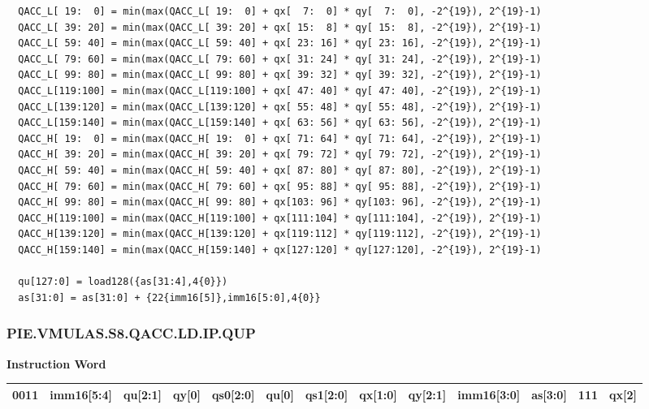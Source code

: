 \begin{lstlisting}
  QACC_L[ 19:  0] = min(max(QACC_L[ 19:  0] + qx[  7:  0] * qy[  7:  0], -2^{19}), 2^{19}-1)
  QACC_L[ 39: 20] = min(max(QACC_L[ 39: 20] + qx[ 15:  8] * qy[ 15:  8], -2^{19}), 2^{19}-1)
  QACC_L[ 59: 40] = min(max(QACC_L[ 59: 40] + qx[ 23: 16] * qy[ 23: 16], -2^{19}), 2^{19}-1)
  QACC_L[ 79: 60] = min(max(QACC_L[ 79: 60] + qx[ 31: 24] * qy[ 31: 24], -2^{19}), 2^{19}-1)
  QACC_L[ 99: 80] = min(max(QACC_L[ 99: 80] + qx[ 39: 32] * qy[ 39: 32], -2^{19}), 2^{19}-1)
  QACC_L[119:100] = min(max(QACC_L[119:100] + qx[ 47: 40] * qy[ 47: 40], -2^{19}), 2^{19}-1)
  QACC_L[139:120] = min(max(QACC_L[139:120] + qx[ 55: 48] * qy[ 55: 48], -2^{19}), 2^{19}-1)
  QACC_L[159:140] = min(max(QACC_L[159:140] + qx[ 63: 56] * qy[ 63: 56], -2^{19}), 2^{19}-1)
  QACC_H[ 19:  0] = min(max(QACC_H[ 19:  0] + qx[ 71: 64] * qy[ 71: 64], -2^{19}), 2^{19}-1)
  QACC_H[ 39: 20] = min(max(QACC_H[ 39: 20] + qx[ 79: 72] * qy[ 79: 72], -2^{19}), 2^{19}-1)
  QACC_H[ 59: 40] = min(max(QACC_H[ 59: 40] + qx[ 87: 80] * qy[ 87: 80], -2^{19}), 2^{19}-1)
  QACC_H[ 79: 60] = min(max(QACC_H[ 79: 60] + qx[ 95: 88] * qy[ 95: 88], -2^{19}), 2^{19}-1)
  QACC_H[ 99: 80] = min(max(QACC_H[ 99: 80] + qx[103: 96] * qy[103: 96], -2^{19}), 2^{19}-1)
  QACC_H[119:100] = min(max(QACC_H[119:100] + qx[111:104] * qy[111:104], -2^{19}), 2^{19}-1)
  QACC_H[139:120] = min(max(QACC_H[139:120] + qx[119:112] * qy[119:112], -2^{19}), 2^{19}-1)
  QACC_H[159:140] = min(max(QACC_H[159:140] + qx[127:120] * qy[127:120], -2^{19}), 2^{19}-1)

  qu[127:0] = load128({as[31:4],4{0}})
  as[31:0] = as[31:0] + {22{imm16[5]},imm16[5:0],4{0}}
\end{lstlisting}

\newpage
\subsubsection{PIE.VMULAS.S8.QACC.LD.IP.QUP}\label{instruction:PIEVMULASS8QACCLDIPQUP}
\setlength\tabcolsep{5pt}
\textbf{Instruction Word} \\
\begin{tabular}{|c|c|c|c|c|c|c|c|c|c|c|c|c|}
	\hline
	0011 & imm16[5:4] & qu[2:1] & qy[0] & qs0[2:0] & qu[0] & qs1[2:0] & qx[1:0] & qy[2:1] & imm16[3:0] & as[3:0] & 111 & qx[2] \\
	\hline
\end{tabular}

